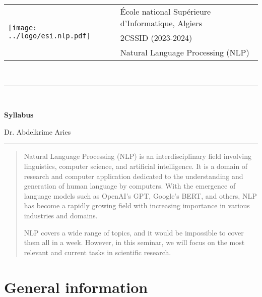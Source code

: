 \documentclass[11pt, a4paper]{article}
\begin{document}
\pagestyle{fancy}

\noindent
\begin{tabular}{ll}
\multirow{3}{*}{\texttt{[image: ../logo/esi.nlp.pdf]}} & \'Ecole national Supérieure d'Informatique, Algiers\\
& 2CSSID (2023-2024)\\
& Natural Language Processing (NLP)
\end{tabular}\\[.25cm]
\noindent\rule{\textwidth}{1pt}\\[-0.25cm]
\begin{center}
{\LARGE \textbf{Syllabus}}
\begin{flushright}
	Dr. Abdelkrime Aries
\end{flushright}
\end{center}\vspace*{-0.25cm}
\noindent\rule{\textwidth}{1pt}

\begin{abstract}
	Natural Language Processing (NLP) is an interdisciplinary field involving linguistics, computer science, and artificial intelligence. 
	It is a domain of research and computer application dedicated to the understanding and generation of human language by computers. 
	With the emergence of language models such as OpenAI's GPT, Google's BERT, and others, NLP has become a rapidly growing field with increasing importance in various industries and domains.
	
	NLP covers a wide range of topics, and it would be impossible to cover them all in a week. 
	However, in this seminar, we will focus on the most relevant and current tasks in scientific research.
\end{abstract}

\section{General information}
\end{document}
